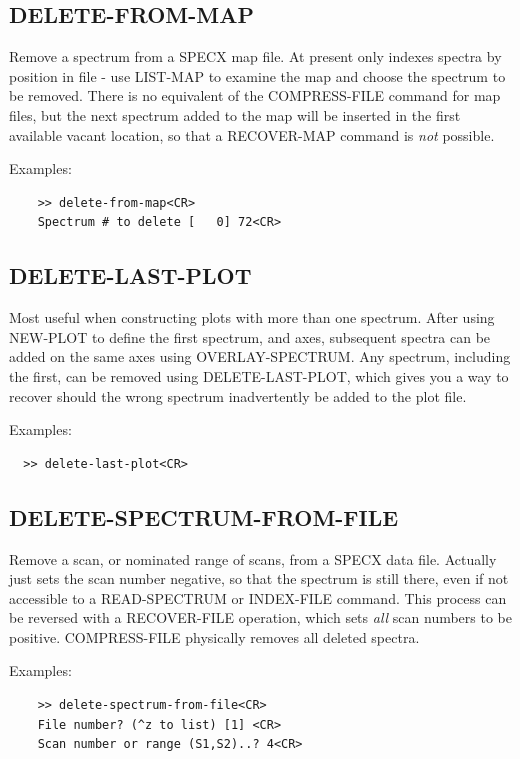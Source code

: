 \documentclass[11pt,twoside]{report}
\begin{document}
\subsection{DELETE-FROM-MAP} 

Remove a spectrum from a SPECX map file. At present only indexes spectra
by position in file - use LIST-MAP to examine the map and choose the
spectrum to be removed. There is no equivalent of the COMPRESS-FILE command
for map files, but the next spectrum added to the map will be inserted in
the first available vacant location, so that a RECOVER-MAP command is {\em not}
possible.

Examples:
\begin{verbatim}
    >> delete-from-map<CR>
    Spectrum # to delete [   0] 72<CR>
\end{verbatim}

\subsection{DELETE-LAST-PLOT} 

Most useful when constructing plots with more than one spectrum. After using
NEW-PLOT to define the first spectrum, and axes, subsequent spectra can be
added on the same axes using OVERLAY-SPECTRUM. Any spectrum, including the
first, can be removed using DELETE-LAST-PLOT, which gives you a way to
recover should the wrong spectrum inadvertently be added to the plot file.

Examples:
\begin{verbatim}
  >> delete-last-plot<CR>
\end{verbatim}

\subsection{DELETE-SPECTRUM-FROM-FILE} 

Remove a scan, or nominated range of scans,
from a SPECX data file. Actually just sets the scan number
negative, so that the spectrum is still there, even if not accessible to
a READ-SPECTRUM or INDEX-FILE command. This process can be reversed with a
RECOVER-FILE operation, which sets {\em all} scan numbers to be positive.
COMPRESS-FILE physically removes all deleted spectra.

Examples:
\begin{verbatim}
    >> delete-spectrum-from-file<CR>
    File number? (^z to list) [1] <CR>
    Scan number or range (S1,S2)..? 4<CR>
\end{verbatim}
\end{document}
